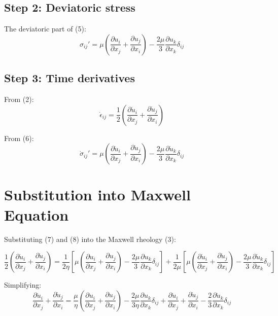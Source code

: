 \documentclass{article}
\begin{document}
\subsection{Step 2: Deviatoric stress}

The deviatoric part of (5):
\begin{equation}
\sigma_{ij}' = \mu\left(\frac{\partial u_i}{\partial x_j} + \frac{\partial u_j}{\partial x_i}\right) - \frac{2\mu}{3}\frac{\partial u_k}{\partial x_k}\delta_{ij}
\end{equation}

\subsection{Step 3: Time derivatives}

From (2):
\begin{equation}
\dot{\epsilon}_{ij} = \frac{1}{2}\left(\frac{\partial \dot{u}_i}{\partial x_j} + \frac{\partial \dot{u}_j}{\partial x_i}\right)
\end{equation}

From (6):
\begin{equation}
\dot{\sigma}_{ij}' = \mu\left(\frac{\partial \dot{u}_i}{\partial x_j} + \frac{\partial \dot{u}_j}{\partial x_i}\right) - \frac{2\mu}{3}\frac{\partial \dot{u}_k}{\partial x_k}\delta_{ij}
\end{equation}

\section{Substitution into Maxwell Equation}

Substituting (7) and (8) into the Maxwell rheology (3):

\begin{equation}
\frac{1}{2}\left(\frac{\partial \dot{u}_i}{\partial x_j} + \frac{\partial \dot{u}_j}{\partial x_i}\right) = \frac{1}{2\eta}\left[\mu\left(\frac{\partial u_i}{\partial x_j} + \frac{\partial u_j}{\partial x_i}\right) - \frac{2\mu}{3}\frac{\partial u_k}{\partial x_k}\delta_{ij}\right] + \frac{1}{2\mu}\left[\mu\left(\frac{\partial \dot{u}_i}{\partial x_j} + \frac{\partial \dot{u}_j}{\partial x_i}\right) - \frac{2\mu}{3}\frac{\partial \dot{u}_k}{\partial x_k}\delta_{ij}\right]
\end{equation}

Simplifying:
\begin{equation}
\frac{\partial \dot{u}_i}{\partial x_j} + \frac{\partial \dot{u}_j}{\partial x_i} = \frac{\mu}{\eta}\left(\frac{\partial u_i}{\partial x_j} + \frac{\partial u_j}{\partial x_i}\right) - \frac{2\mu}{3\eta}\frac{\partial u_k}{\partial x_k}\delta_{ij} + \frac{\partial \dot{u}_i}{\partial x_j} + \frac{\partial \dot{u}_j}{\partial x_i} - \frac{2}{3}\frac{\partial \dot{u}_k}{\partial x_k}\delta_{ij}
\end{equation}
\end{document}

